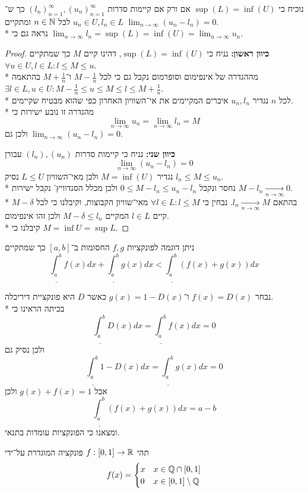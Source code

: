 \Subquestion{}
נוכיח כי $\sup(L) = \inf(U)$ אם ורק אם קיימות סדרות ${(l_n)}_{n = 1}^\infty, {(u_n)}_{n = 1}^\infty$ כך ש־$u_n \in U, l_n \in L$ לכל $n \in \mathbb{N}$ ומתקיים $\lim_{n \to \infty} (u_n - l_n) = 0$. \\*
נראה גם כי $\lim_{n \to \infty} l_n = \sup(L) = \inf(U) = \lim_{n \to \infty} u_n$.
\begin{proof}
	\textbf{כיוון ראשון:}
	נניח כי $\sup(L) = \inf(U)$, דהינו קיים $M$ כך שמתקיים $\forall u \in U, l \in L : l \le M \le u$. \\*
	מההגדרה של אינפימום וסופרמום נקבל גם כי לכל $M - \frac{1}{n}$ ו־$M + \frac{1}{n}$ בהתאמה $\exists l \in L, u \in U : M - \frac{1}{n} \le u \le M \le l \le M + \frac{1}{n}$. \\*
	לכל $n$ נגדיר $u_n, l_n$ איברים המקיימים את אי־השוויון האחרון כפי שהוא מבטיח שקיימים. \\*
	מהגדרה זו נובע ישירות כי
	\[
		\lim_{n \to \infty} u_n = \lim_{n \to \infty} l_n = M
	\]
	ולכן גם $\lim_{n \to \infty} (u_n - l_n) = 0$.

	\textbf{כיוון שני:}
	נניח כי קיימות סדרות $(l_n), (u_n)$ עבורן
	\[
		\lim_{n \to \infty} (u_n - l_n) = 0
	\]
	נגדיר $M = \inf(U)$ ולכן מאי־השוויון $L \le U$ נסיק $l_n \le M \le u_n$. \\*
	נחסר ונקבל $0 \le M - l_n \le u_n - l_n$ ולכן מכלל הסנדוויץ' נקבל ישירות $M - l_n \xrightarrow[n \to \infty]{} 0$. \\*
	בהתאם $l_n \xrightarrow[n \to \infty]{} M$. נבחין כי $\forall l \in L : l \le M$ מאי־שוויון הקבוצות, וקיבלנו כי לכל $M - \delta$ קיים $l \in L$ המקיים $M - \delta \le l_n$ ולכן זהו אינפימום. \\*
	קיבלנו כי $M = \inf U = \sup L$.
\end{proof}

\Question{}
ניתן דוגמה לפונקציות $f, g$ החסומות ב־$[a, b]$ כך שמתקיים
\[
	\underline{\int_{a}^{b}} f(x)dx
	+ \underline{\int_{a}^{b}} g(x)dx
	< \underline{\int_{a}^{b}} (f(x) + g(x))dx
\]

נבחר $f(x) = D(x)$ ו־$g(x) = 1 - D(x)$ כאשר $D$ היא פונקציית דיריכלה. \\*
בכיתה הראינו כי
\[
	\underline{\int_{a}^{b}} D(x)dx
	= \underline{\int_{a}^{b}} f(x)dx
	= 0
\]
ולכן נסיק גם
\[
	\underline{\int_{a}^{b}} 1 - D(x)dx
	= \underline{\int_{a}^{b}} g(x)dx
	= 0
\]
אבל $g(x) + f(x) = 1$ ולכן
\[
	\underline{\int_{a}^{b}} (f(x) + g(x))dx = a - b
\]
ומצאנו כי הפונקציות עומדות בתנאי.

\Question{}
תהי $f : [0, 1] \to \mathbb{R}$ פונקציה המוגדרת על־ידי
\[
	f(x) = \begin{cases}
		x & x \in \mathbb{Q} \cap [0, 1] \\
		0 & x \in [0, 1] \setminus \mathbb{Q}
	\end{cases}
\]

